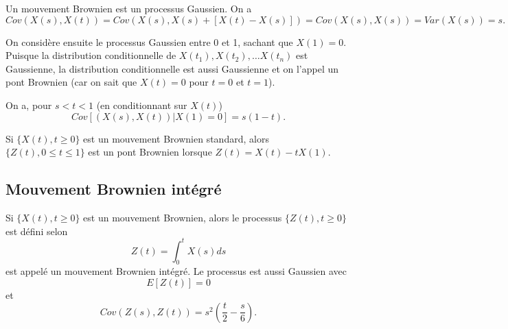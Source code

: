 Un mouvement Brownien est un processus Gaussien. On a 
$$Cov(X(s), X(t)) =Cov(X(s), X(s) + [X(t) - X(s)]) = Cov(X(s), X(s)) = Var(X(s)) = s.$$

On considère ensuite le processus Gaussien entre 0 et 1, sachant que $X(1) = 0$. Puisque la distribution conditionnelle de $X(t_1), X(t_2), \dots X(t_n)$ est Gaussienne, la distribution conditionnelle est aussi Gaussienne et on l'appel un pont Brownien (car on sait que $X(t) = 0$ pour $t=0$ et $t=1$). 

On a, pour $s<t<1$ (en conditionnant sur $X(t)$)
$$Cov[(X(s), X(t)) \vert X(1) = 0] = s(1-t).$$

\begin{proposition}{}{}
	Si $\{X(t), t\geq 0\}$ est un mouvement Brownien standard, alors $\{Z(t), 0\leq t \leq 1\}$ est un pont Brownien lorsque $Z(t) = X(t) - tX(1)$.
\end{proposition}

\subsection{Mouvement Brownien intégré}

Si $\{X(t), t\geq 0\}$ est un mouvement Brownien, alors le processus $\{Z(t), t\geq 0\}$ est défini selon
$$Z(t) = \int_{0}^{t} X(s) ds$$
est appelé un mouvement Brownien intégré. Le processus est aussi Gaussien avec 
$$E[Z(t)] = 0$$
et
$$Cov(Z(s), Z(t)) = s^2\left(\frac{t}{2} - \frac{s}{6}\right).$$





































